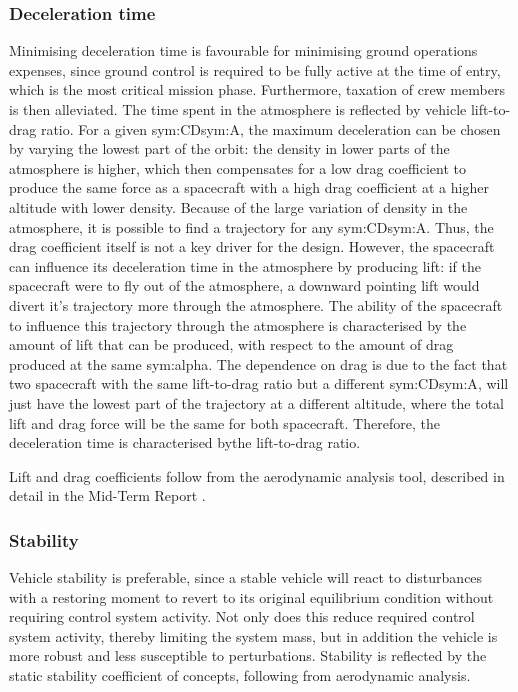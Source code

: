 \subsubsection{Deceleration time}
Minimising deceleration time is favourable for minimising ground operations expenses, since ground control is required to be fully active at the time of entry, which is the most critical mission phase. Furthermore, taxation of crew members is then alleviated. The time spent in the atmosphere is reflected by vehicle lift-to-drag ratio. For a given \gls{sym:CD}\gls{sym:A}, the maximum deceleration can be chosen by varying the lowest part of the orbit: the density in lower parts of the atmosphere is higher, which then compensates for a low drag coefficient to produce the same force as a spacecraft with a high drag coefficient at a higher altitude with lower density. Because of the large variation of density in the atmosphere, it is possible to find a trajectory for any \gls{sym:CD}\gls{sym:A}. Thus, the drag coefficient itself is not a key driver for the design. However, the spacecraft can influence its deceleration time in the atmosphere by producing lift: if the spacecraft were to fly out of the atmosphere, a downward pointing lift would divert it's trajectory more through the atmosphere. The ability of the spacecraft to influence this trajectory through the atmosphere is characterised by the amount of lift that can be produced, with respect to the amount of drag produced at the same \gls{sym:alpha}. The dependence on drag is due to the fact that two spacecraft with the same lift-to-drag ratio but a different \gls{sym:CD}\gls{sym:A}, will just have the lowest part of the trajectory at a different altitude, where the total lift and drag force will be the same for both spacecraft. Therefore, the deceleration time is characterised bythe  lift-to-drag ratio. 

Lift and drag coefficients follow from the aerodynamic analysis tool, described in detail in the Mid-Term Report \cite[p.34-46]{Balasooriyan2015b}.

\subsubsection{Stability}
Vehicle stability is preferable, since a stable vehicle will react to disturbances with a restoring moment to revert to its original equilibrium condition without requiring control system activity. Not only does this reduce required control system activity, thereby limiting the system mass, but in addition the vehicle is more robust and less susceptible to perturbations. Stability is reflected by the static stability coefficient of concepts, following from aerodynamic analysis.

